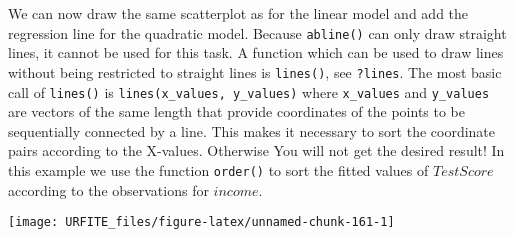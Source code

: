 \documentclass[]{book}
\newenvironment{Shaded}{\begin{snugshade}}{\end{snugshade}}
\newcommand{\KeywordTok}[1]{\textcolor[rgb]{0.13,0.29,0.53}{\textbf{#1}}}
\newcommand{\DataTypeTok}[1]{\textcolor[rgb]{0.13,0.29,0.53}{#1}}
\newcommand{\DecValTok}[1]{\textcolor[rgb]{0.00,0.00,0.81}{#1}}
\newcommand{\StringTok}[1]{\textcolor[rgb]{0.31,0.60,0.02}{#1}}
\newcommand{\CommentTok}[1]{\textcolor[rgb]{0.56,0.35,0.01}{\textit{#1}}}
\newcommand{\OperatorTok}[1]{\textcolor[rgb]{0.81,0.36,0.00}{\textbf{#1}}}
\newcommand{\NormalTok}[1]{#1}
\theoremstyle{definition}
\theoremstyle{definition}
\theoremstyle{definition}
\theoremstyle{remark}
\begin{document}
We can now draw the same scatterplot as for the linear model and add the
regression line for the quadratic model. Because \texttt{abline()} can
only draw straight lines, it cannot be used for this task. A function
which can be used to draw lines without being restricted to straight
lines is \texttt{lines()}, see \texttt{?lines}. The most basic call of
\texttt{lines()} is \texttt{lines(x\_values,\ y\_values)} where
\texttt{x\_values} and \texttt{y\_values} are vectors of the same length
that provide coordinates of the points to be sequentially connected by a
line. This makes it necessary to sort the coordinate pairs according to
the X-values. Otherwise You will not get the desired result! In this
example we use the function \texttt{order()} to sort the fitted values
of \(TestScore\) according to the observations for \(income\).

\begin{Shaded}
\end{Shaded}

\begin{center}\texttt{[image: URFITE\_files/figure-latex/unnamed-chunk-161-1]} \end{center}
\end{document}
